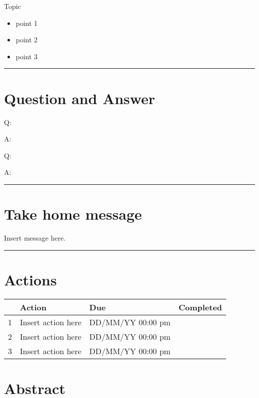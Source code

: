 \documentclass[
]{book}
\providecommand{\tightlist}{%
  \setlength{\itemsep}{0pt}\setlength{\parskip}{0pt}}
\begin{document}
Topic

\begin{itemize}
\tightlist
\item
  point 1
\item
  point 2
\item
  point 3
\end{itemize}

\begin{center}\rule{0.5\linewidth}{0.5pt}\end{center}

\hypertarget{question-and-answer-1}{%
\section*{Question and Answer}\label{question-and-answer-1}}

Q:

A:

Q:

A:

\begin{center}\rule{0.5\linewidth}{0.5pt}\end{center}

\hypertarget{take-home-message-1}{%
\section*{Take home message}\label{take-home-message-1}}

Insert message here.

\begin{center}\rule{0.5\linewidth}{0.5pt}\end{center}

\hypertarget{actions-1}{%
\section*{Actions}\label{actions-1}}

\begin{longtable}[]{@{}llll@{}}
\toprule
& Action & Due & Completed\tabularnewline
\midrule
\endhead
1 & Insert action here & DD/MM/YY 00:00 pm &\tabularnewline
2 & Insert action here & DD/MM/YY 00:00 pm &\tabularnewline
3 & Insert action here & DD/MM/YY 00:00 pm &\tabularnewline
\bottomrule
\end{longtable}

\hypertarget{abstract-2}{%
\section*{Abstract}\label{abstract-2}}
\end{document}
